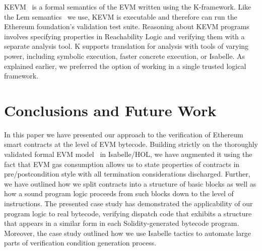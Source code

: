 \documentclass[sigplan,10pt]{acmart}\settopmatter{printfolios=true,printccs=false,printacmref=false}
\begin{document}
KEVM~\cite{Hildenbrandt_SZRDGR_17} is a formal semantics of the EVM written using the K-framework.
Like the Lem semantics~\cite{Yoichi} we use, KEVM is executable and therefore can run the Ethereum foundation's validation test suite.
Reasoning about KEVM programs involves specifying properties in Reachability Logic and
verifying them with a separate analysis tool.
K supports translation for analysis with tools of varying
power, including symbolic execution, faster concrete execution, or Isabelle.
As explained earlier, we preferred the option of working in a single trusted logical framework.



\section{Conclusions and Future Work}
\label{sec:concl}
In this paper we have presented our approach to the verification of Ethereum smart contracts
at the level of EVM bytecode. Building strictly on the thoroughly validated formal EVM model~\cite{Yoichi} in Isabelle/HOL,
we have augmented it using the fact that EVM gas consumption allows us to state properties of contracts in pre/postcondition style
with all termination considerations discharged. Further, we have outlined how we split contracts into a
structure of basic blocks as well as how a sound program logic proceeds from such blocks down to the level of instructions. 
The presented case study has demonstrated the applicability of our
program logic to real bytecode, verifying dispatch code that exhibits a structure
that appears in a similar form
in each Solidity-generated bytecode program. 
Moreover, the case study outlined how we use Isabelle tactics to automate
large parts of verification condition generation process.
\end{document}
